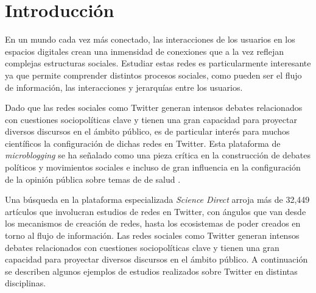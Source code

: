 \chapter{Introducción}
\label{chapter:1}

En un mundo cada vez más conectado, las interacciones de los usuarios en los espacios digitales crean una inmensidad de conexiones que a la vez reflejan complejas estructuras sociales. Estudiar estas redes es particularmente interesante ya que permite comprender distintos procesos sociales, como pueden ser el flujo de información, las interacciones y jerarquías entre los usuarios.

Dado que las redes sociales como Twitter generan intensos debates relacionados con cuestiones sociopolíticas clave y tienen una gran capacidad para proyectar diversos discursos en el ámbito público, es de particular interés para muchos científicos la configuración de dichas redes en Twitter. Esta plataforma de \textit{microblogging} se ha señalado como una pieza crítica en la construcción de debates políticos y movimientos sociales \cite{barbera_understanding_2015} e incluso de gran influencia en la configuración de la opinión pública sobre temas de de salud \cite{sharevski_misinformation_2022}.

Una búsqueda en la plataforma especializada \textit{Science Direct} arroja más de 32,449 artículos que involucran estudios de redes en Twitter, con ángulos que van desde los mecanismos de creación de redes, hasta los ecosistemas de poder creados en torno al flujo de información. Las redes sociales como Twitter generan intensos debates relacionados con cuestiones sociopolíticas clave y tienen una gran capacidad para proyectar diversos discursos en el ámbito público. A continuación se describen algunos ejemplos de estudios realizados sobre Twitter en distintas disciplinas. 

